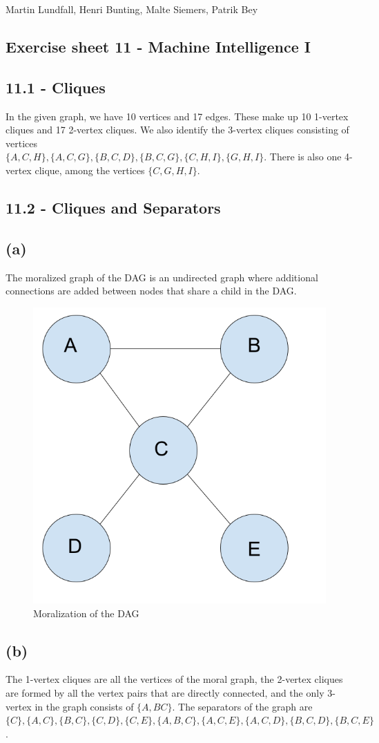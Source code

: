 \documentclass[11pt,a4paper]{article}
\begin{document}
\noindent
Martin Lundfall, Henri Bunting, Malte Siemers, Patrik Bey
\begin{centering}
  \section*{Exercise sheet 11 - Machine Intelligence I}
  \end{centering}
\subsection*{11.1 - Cliques}
In the given graph, we have 10 vertices and 17 edges. These make up 10 1-vertex cliques and 17 2-vertex cliques. We also identify the 3-vertex cliques consisting of vertices\\ $\{A,C,H\},\{A, C, G\},\{B, C, D\}, \{B, C, G\}, \{C, H, I\}, \{G, H, I\}$. There is also one 4-vertex clique, among the vertices $\{C, G, H, I\}$.
\subsection*{11.2 - Cliques and Separators}
\subsection*{(a)}
The moralized graph of the DAG is an undirected graph where additional connections are added between nodes that share a child in the DAG.
\begin{figure}[h]
  \caption{Moralization of the DAG}
  \centering
  \includegraphics[width=.7\textwidth]{moral}
\end{figure}
\subsection*{(b)}
The 1-vertex cliques are all the vertices of the moral graph, the 2-vertex cliques are formed by all the vertex pairs that are directly connected, and the only 3-vertex in the graph consists of $\{A, B C\}$. The separators of the graph are $\{C\}, \{A, C\}, \{B, C\}, \{C, D\}, \{C, E\}, \{A, B, C\}, \{A, C, E\}, \{A, C, D\}, \{B, C, D\}, \{B, C, E\}$.
\end{document}
